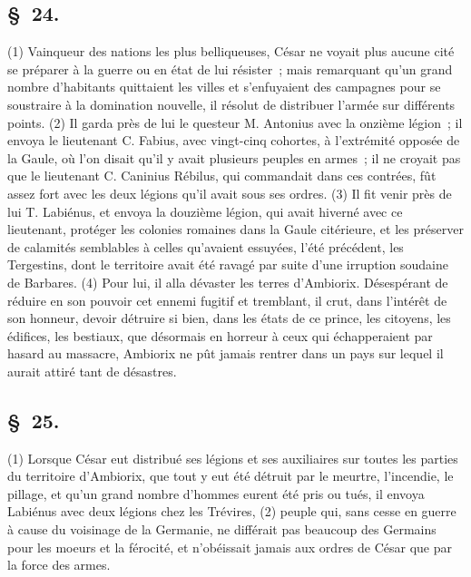 \documentclass[french,twoside]{book} %
\begin{document}
\subsection[{§ 24.}]{ \textsc{§ 24.} }
\noindent (1) Vainqueur des nations les plus belliqueuses, César ne voyait plus aucune cité se préparer à la guerre ou en état de lui résister ; mais remarquant qu’un grand nombre d’habitants quittaient les villes et s’enfuyaient des campagnes pour se soustraire à la domination nouvelle, il résolut de distribuer l’armée sur différents points. (2) Il garda près de lui le questeur M. Antonius avec la onzième légion ; il envoya le lieutenant C. Fabius, avec vingt-cinq cohortes, à l’extrémité opposée de la Gaule, où l’on disait qu’il y avait plusieurs peuples en armes ; il ne croyait pas que le lieutenant C. Caninius Rébilus, qui commandait dans ces contrées, fût assez fort avec les deux légions qu’il avait sous ses ordres. (3) Il fit venir près de lui T. Labiénus, et envoya la douzième légion, qui avait hiverné avec ce lieutenant, protéger les colonies romaines dans la Gaule citérieure, et les préserver de calamités semblables à celles qu’avaient essuyées, l’été précédent, les Tergestins, dont le territoire avait été ravagé par suite d’une irruption soudaine de Barbares. (4) Pour lui, il alla dévaster les terres d’Ambiorix. Désespérant de réduire en son pouvoir cet ennemi fugitif et tremblant, il crut, dans l’intérêt de son honneur, devoir détruire si bien, dans les états de ce prince, les citoyens, les édifices, les bestiaux, que désormais en horreur à ceux qui échapperaient par hasard au massacre, Ambiorix ne pût jamais rentrer dans un pays sur lequel il aurait attiré tant de désastres.
\subsection[{§ 25.}]{ \textsc{§ 25.} }
\noindent (1) Lorsque César eut distribué ses légions et ses auxiliaires sur toutes les parties du territoire d’Ambiorix, que tout y eut été détruit par le meurtre, l’incendie, le pillage, et qu’un grand nombre d’hommes eurent été pris ou tués, il envoya Labiénus avec deux légions chez les Trévires, (2) peuple qui, sans cesse en guerre à cause du voisinage de la Germanie, ne différait pas beaucoup des Germains pour les moeurs et la férocité, et n’obéissait jamais aux ordres de César que par la force des armes.
\end{document}
